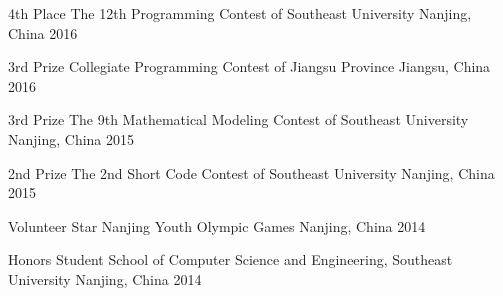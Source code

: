 
\begin{cvhonors}


  \cvhonor
    {4th Place} %
    {The 12th Programming Contest of Southeast University} %
    {Nanjing, China} %
    {2016} %

  \cvhonor
    {3rd Prize} %
    {Collegiate Programming Contest of Jiangsu Province} %
    {Jiangsu, China} %
    {2016} %

  \cvhonor
    {3rd Prize} %
    {The 9th Mathematical Modeling Contest of Southeast University} %
    {Nanjing, China} %
    {2015} %

  \cvhonor
    {2nd Prize} %
    {The 2nd Short Code Contest of Southeast University} %
    {Nanjing, China} %
    {2015} %


  \cvhonor
    {Volunteer Star} %
    {Nanjing Youth Olympic Games} %
    {Nanjing, China} %
    {2014} %
                
  \cvhonor
    {Honors Student} %
    {School of Computer Science and Engineering, Southeast University} %
    {Nanjing, China} %
    {2014} %















\end{cvhonors}
